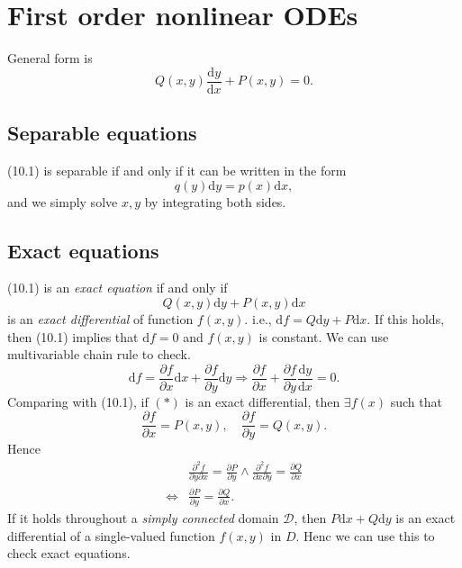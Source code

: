 \documentclass[10pt]{article}
\def\d{{\mathrm d}}
\begin{document}
    \section{First order nonlinear ODEs}
    General form is 
    \begin{equation}
        Q(x,y)\frac{\mathrm{d}y}{\mathrm{d}x}+P(x,y)=0.
    \end{equation}
    \subsection{Separable equations}
    (10.1) is separable if and only if it can be written in the form 
    \[
        q(y)\d y=p(x)\d x,
    \]
    and we simply solve $x,y$ by integrating both sides.
    \subsection{Exact equations}
    (10.1) is an \textit{exact equation} if and only if 
    \[
        Q(x,y)\d y+P(x,y)\d x\tag{*}
    \]
    is an \textit{exact differential} of function $f(x,y)$. i.e., $ \d f= Q\d y+P\d x $. If this holds, then (10.1) implies that $ \d f=0 $ and $f(x,y)$ is constant. We can use multivariable chain rule to check.
    \[
        \d f=\frac{\partial f}{\partial x}\d x+ \frac{\partial f}{\partial y}\d y \Longrightarrow \frac{\partial f}{\partial x}+\frac{\partial f}{\partial y}\frac{\mathrm{d}y}{\mathrm{d}x}=0     
    .\]
    Comparing with (10.1), if $(*)$ is an exact differential, then $\exists f(x)$ such that 
    \[
        \frac{\partial f}{\partial x}=P(x,y),\quad \frac{\partial f}{\partial y}=Q(x,y)  \tag{**}
    .\]
    Hence 
    \[
        \begin{aligned}
             & \frac{\partial^2 f}{\partial y\partial x} =\frac{\partial P}{\partial y} \land  \frac{\partial^2 f}{\partial x\partial y} =\frac{\partial Q}{\partial x}\\
             \Longleftrightarrow & \boxed{\frac{\partial P}{\partial y}=\frac{\partial Q}{\partial x}}.
        \end{aligned}
    \]
    If it holds throughout a \textit{simply connected} domain $\mathcal{D}$, then $ P\d x+Q\d y $ is an exact differential of a single-valued function $f(x,y)$ in $D$. Henc we can use this to check exact equations.
\end{document}
